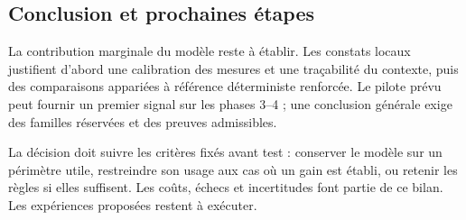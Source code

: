 \documentclass[11pt,a4paper]{article}
\begin{document}
\begin{samepage}
\section{Conclusion et prochaines étapes}
La contribution marginale du modèle reste à établir. Les constats locaux
justifient d'abord une calibration des mesures et une traçabilité du contexte,
puis des comparaisons appariées à référence déterministe renforcée. Le pilote
prévu peut fournir un premier signal sur les phases 3--4 ; une conclusion
générale exige des familles réservées et des preuves admissibles.

La décision doit suivre les critères fixés avant test : conserver le modèle
sur un périmètre utile, restreindre son usage aux cas où un gain est établi,
ou retenir les règles si elles suffisent. Les coûts, échecs et incertitudes
font partie de ce bilan. Les expériences proposées restent à exécuter.

\par\end{samepage}
{}
\end{document}
